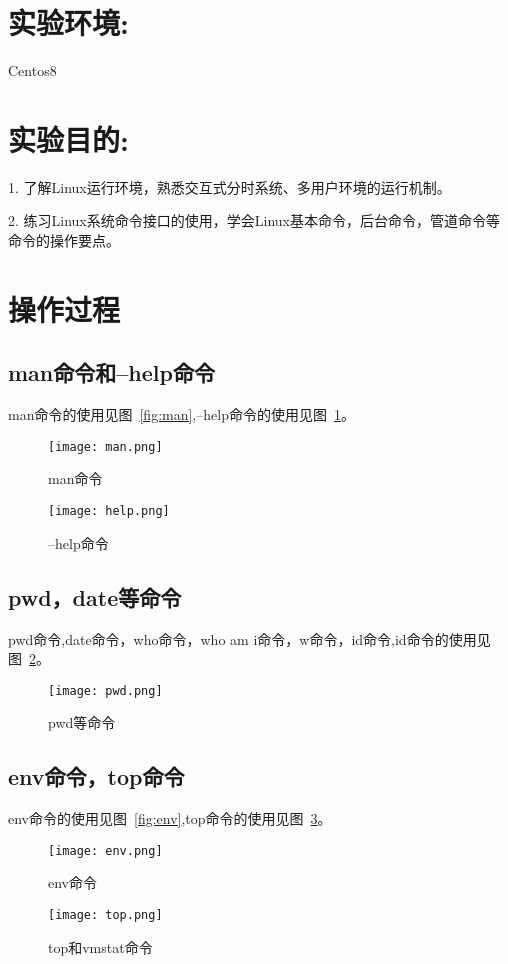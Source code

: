 \documentclass{shureport}
\date{\zhtoday}
\begin{document}
\makeheader


\section*{实验环境:}
Centos8
\section*{实验目的:}
1. 了解Linux运行环境，熟悉交互式分时系统、多用户环境的运行机制。
\par 2. 练习Linux系统命令接口的使用，学会Linux基本命令，后台命令，管道命令等命令的操作要点。 

\section*{操作过程}
    \subsection{man命令和--help命令}
    man命令的使用见图~\ref{fig:man},--help命令的使用见图~\ref{fig:help}。
        \begin{figure}[H]
            \centering
            \texttt{[image: man.png]}
            \caption{man命令}
            \label{fig:man}
            \centering
            \texttt{[image: help.png]}
            \caption{--help命令}
            \label{fig:help}
    \end{figure}

    \subsection{pwd，date等命令}
    pwd命令,date命令，who命令，who am i命令，w命令，id命令,id命令的使用见图~\ref{fig:pwd}。
        \begin{figure}[H]
            \centering
            \texttt{[image: pwd.png]}
            \caption{pwd等命令}
            \label{fig:pwd} 
        \end{figure}
    
    \subsection{env命令，top命令}
    env命令的使用见图~\ref{fig:env},top命令的使用见图~\ref{fig:top}。
        \begin{figure}[H]
            \centering
            \texttt{[image: env.png]}
            \caption{env命令}
            \label{fig:env}
            \centering
            \texttt{[image: top.png]}
            \caption{top和vmstat命令}
            \label{fig:top}
        \end{figure}
\end{document}
